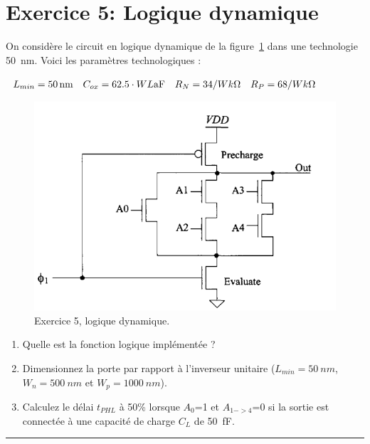 \documentclass[frenchb,DIV=14]{scrartcl}
\begin{document}
\clearpage
\section*{Exercice 5: Logique dynamique}
On considère le circuit en logique dynamique de la figure~\ref{fig9-2} dans une technologie
\SI{50}{nm}. Voici les paramètres technologiques :
\begin{center} 
	$\begin{array}{l l l l}
		L_{min} = \SI{50}{nm} & C_{ox} = 62.5\cdot WL\text{aF} 
		& R_N= 34/W k\Omega
		& R_P= 68/W k\Omega \\ 
	\end{array}$
\end{center}

\begin{figure}[]
   \centering
   \includegraphics[width=14cm]{figures/fig9-2.png}
   \caption{Exercice 5, logique dynamique.}
   \label{fig9-2}
\end{figure}

\begin{enumerate}
	\item Quelle est la fonction logique implémentée ?
	\item Dimensionnez la porte par rapport à l'inverseur unitaire ($L_{min}=\SI{50}{nm}$,
	$W_n=\SI{500}{nm}$ et $W_p=\SI{1000}{nm}$).
	\item Calculez le délai $t_{PHL}$ à 50\% lorsque $A_0$=1 et $A_{1->4}$=0 si la sortie
	est connectée à une capacité de charge $C_L$ de \SI{50}{\femto\farad}.
\end{enumerate}

\hspace{1cm}\hrule\hspace{1cm}
\end{document}
